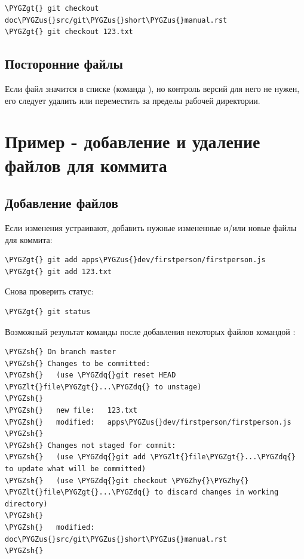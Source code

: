 \documentclass[a4paper,12pt,oneside]{sphinxmanual}
\def\PYGZus{\char`\_}
\def\PYGZlt{\char`\<}
\def\PYGZgt{\char`\>}
\def\PYGZsh{\char`\#}
\def\PYGZhy{\char`\-}
\def\PYGZdq{\char`\"}
\begin{document}
\begin{Verbatim}[commandchars=\\\{\}]
\PYGZgt{} git checkout doc\PYGZus{}src/git\PYGZus{}short\PYGZus{}manual.rst
\PYGZgt{} git checkout 123.txt
\end{Verbatim}


\subsection{Посторонние файлы}
\label{git_short_manual:id8}
Если файл значится в списке  (команда ), но контроль версий для него не нужен, его следует удалить или переместить за пределы рабочей директории.


\section{Пример - добавление и удаление файлов для коммита}
\label{git_short_manual:index-4}\label{git_short_manual:git-example-add-rm-commit}\label{git_short_manual:id9}

\subsection{Добавление файлов}
\label{git_short_manual:id10}
Если изменения устраивают, добавить нужные измененные и/или новые файлы для коммита:

\begin{Verbatim}[commandchars=\\\{\}]
\PYGZgt{} git add apps\PYGZus{}dev/firstperson/firstperson.js
\PYGZgt{} git add 123.txt
\end{Verbatim}

Снова проверить статус:

\begin{Verbatim}[commandchars=\\\{\}]
\PYGZgt{} git status
\end{Verbatim}

Возможный результат команды  после добавления некоторых файлов командой :

\begin{Verbatim}[commandchars=\\\{\}]
\PYGZsh{} On branch master
\PYGZsh{} Changes to be committed:
\PYGZsh{}   (use \PYGZdq{}git reset HEAD \PYGZlt{}file\PYGZgt{}...\PYGZdq{} to unstage)
\PYGZsh{}
\PYGZsh{}   new file:   123.txt
\PYGZsh{}   modified:   apps\PYGZus{}dev/firstperson/firstperson.js
\PYGZsh{}
\PYGZsh{} Changes not staged for commit:
\PYGZsh{}   (use \PYGZdq{}git add \PYGZlt{}file\PYGZgt{}...\PYGZdq{} to update what will be committed)
\PYGZsh{}   (use \PYGZdq{}git checkout \PYGZhy{}\PYGZhy{} \PYGZlt{}file\PYGZgt{}...\PYGZdq{} to discard changes in working directory)
\PYGZsh{}
\PYGZsh{}   modified:   doc\PYGZus{}src/git\PYGZus{}short\PYGZus{}manual.rst
\PYGZsh{}
\end{Verbatim}
\end{document}
